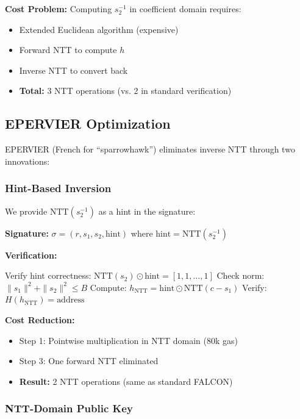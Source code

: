 \textbf{Cost Problem:} Computing $s_2^{-1}$ in coefficient domain requires:
\begin{itemize}
    \item Extended Euclidean algorithm (expensive)
    \item Forward NTT to compute $h$
    \item Inverse NTT to convert back
    \item \textbf{Total:} 3 NTT operations (vs. 2 in standard verification)
\end{itemize}

\subsection{EPERVIER Optimization}

EPERVIER (French for ``sparrowhawk'') eliminates inverse NTT through two innovations:

\subsubsection{Hint-Based Inversion}

We provide $\text{NTT}(s_2^{-1})$ as a hint in the signature:

\textbf{Signature:} $\sigma = (r, s_1, s_2, \text{hint})$ where $\text{hint} = \text{NTT}(s_2^{-1})$

\textbf{Verification:}
\begin{algorithmic}[1]
\STATE Verify hint correctness: $\text{NTT}(s_2) \odot \text{hint} = [1, 1, \ldots, 1]$
\STATE Check norm: $\|s_1\|^2 + \|s_2\|^2 \leq B$
\STATE Compute: $h_{\text{NTT}} = \text{hint} \odot \text{NTT}(c - s_1)$
\STATE Verify: $H(h_{\text{NTT}}) = \text{address}$
\end{algorithmic}

\textbf{Cost Reduction:}
\begin{itemize}
    \item Step 1: Pointwise multiplication in NTT domain (80k gas)
    \item Step 3: One forward NTT eliminated
    \item \textbf{Result:} 2 NTT operations (same as standard FALCON)
\end{itemize}

\subsubsection{NTT-Domain Public Key}

